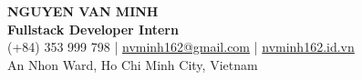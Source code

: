 \begin{center}
    {\fontsize{25}{28}\selectfont\bfseries NGUYEN VAN MINH}\\[4pt]
    {\large\bfseries Fullstack Developer Intern}\\[6pt]
    (+84) 353 999 798 \;|\; \href{mailto:nvminh162@gmail.com}{nvminh162@gmail.com} \;|\; \href{https://nvminh162.id.vn}{nvminh162.id.vn}\\[3pt]
    An Nhon Ward, Ho Chi Minh City, Vietnam
    \\ \vspace{-1pt}
\end{center}

